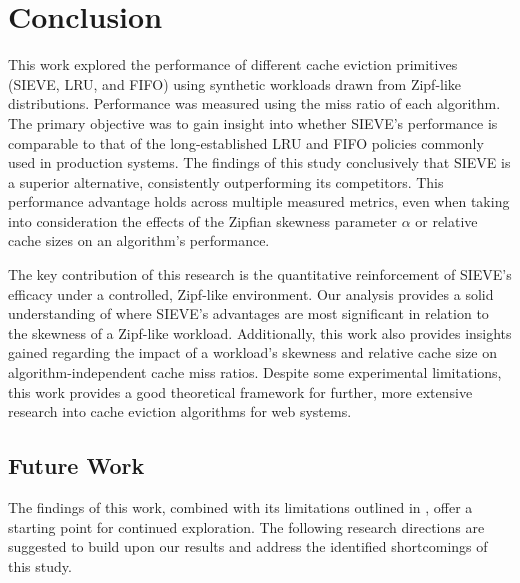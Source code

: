 \chapter{Conclusion}\label{chapter:conclusion}

This work explored the performance of different cache eviction primitives (SIEVE, LRU, and FIFO) using synthetic workloads drawn from Zipf-like distributions. Performance was measured using the miss ratio of each algorithm. The primary objective was to gain insight into whether SIEVE's performance is comparable to that of the long-established LRU and FIFO policies commonly used in production systems. The findings of this study conclusively that SIEVE is a superior alternative, consistently outperforming its competitors. This performance advantage holds across multiple measured metrics, even when taking into consideration the effects of the Zipfian skewness parameter $\alpha$ or relative cache sizes on an algorithm's performance. 

The key contribution of this research is the quantitative reinforcement of SIEVE's efficacy under a controlled, Zipf-like environment. Our analysis provides a solid understanding of where SIEVE's advantages are most significant in relation to the skewness of a Zipf-like workload. Additionally, this work also provides insights gained regarding the impact of a workload's skewness and relative cache size on algorithm-independent cache miss ratios. Despite some experimental limitations, this work provides a good theoretical framework for further, more extensive research into cache eviction algorithms for web systems.

\section{Future Work}
The findings of this work, combined with its limitations outlined in , offer a starting point for continued exploration. The following research directions are suggested to build upon our results and address the identified shortcomings of this study.


